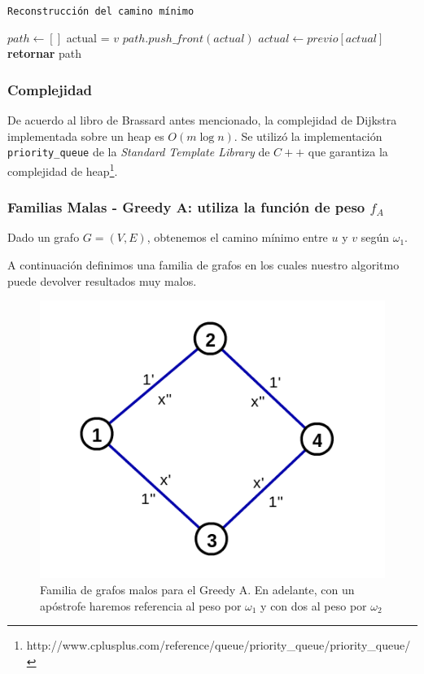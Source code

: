 \begin{algorithm}
    \caption{\texttt{Reconstrucción del camino mínimo}}
\begin{algorithmic}[1]
    \State $path \leftarrow []$
    \State actual = $v$
        \State $path.push\_front(actual)$
        \State $actual \leftarrow previo[actual]$
    \EndWhile
    \State \textbf{retornar} path
\end{algorithmic}
\end{algorithm}

\newpage
\subsubsection{Complejidad}

De acuerdo al libro de Brassard antes mencionado, la complejidad de Dijkstra implementada sobre un heap es $O(m \log n)$. Se utilizó la implementación \texttt{priority\_queue} de la \textit{Standard Template Library} de $C++$ que garantiza la complejidad de heap\footnote{http://www.cplusplus.com/reference/queue/priority\_queue/priority\_queue/}. 

\clearpage
\subsubsection{Familias Malas - Greedy A: utiliza la función de peso $f_{A}$}\label{subsubsec:greedy-a}
Dado un grafo $G = (V,E)$, obtenemos el camino m\'inimo entre $u$ y $v$ seg\'un $\omega_1$. 

A continuación definimos una familia de grafos en los cuales nuestro algoritmo puede devolver resultados muy malos.

\begin{figure}[H]
    \begin{center}
        \includegraphics[scale=0.5]{imagenes/maloGreedyA.png}
        \caption{Familia de grafos malos para el Greedy A. En adelante, con un apóstrofe haremos referencia al peso por $\omega_1$ y con dos al peso por $\omega_2$}
    \end{center}
\end{figure}

